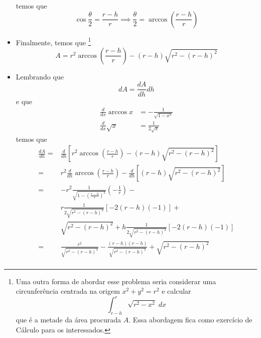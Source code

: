\documentclass[brazilian,11pt]{article}
\begin{document}
\begin{itemize}
\begin{center}
        \end{center}
        temos que
        \[
            \cos{\frac{\theta}{2}}=\frac{r-h}{r} \implies
            \frac{\theta}{2}=\arccos{\left(\frac{r-h}{r}\right)}
        \]
    \item Finalmente, temos que
        \footnote{Uma outra forma de abordar esse problema seria considerar uma 
        circunferência centrada na origem \(x^2+y^2=r^2\) e calcular
        \[
            \int_{r-h}^{r} \sqrt{r^2-x^2}\; dx
        \]
        que é a metade da área procurada \(A\). Essa abordagem fica como 
        exercício de Cálculo para os interessados.
        }
        \[
            A=
            r^2\arccos{\left(\frac{r-h}{r}\right)}
            -
            (r-h) \sqrt{r^2-(r-h)^2}
        \]
    \item Lembrando que 
        \[
            dA=\frac{dA}{dh} dh
        \]
        e que 
        \begin{align*}
            \frac{d}{dx}\arccos x &= -\frac{1}{\sqrt{1-x^2}} \\
            \frac{d}{dx}\sqrt{x} &=\frac{1}{2\sqrt{x}}
        \end{align*}
        temos que
        \[
            \begin{split}
                \frac{dA}{dh} =&
                \frac{d}{dh}\left[
                    r^2\arccos{\left(\frac{r-h}{r}\right)}
                    -
                    (r-h) \sqrt{r^2-(r-h)^2}
                    \right] \\
                =&r^2\frac{d}{dh}\arccos{\left(\frac{r-h}{r}\right)}
                -
                \frac{d}{dh}\left[
                    (r-h) \sqrt{r^2-(r-h)^2}
                \right] \\
            =&-r^2\frac{1}{\sqrt{1-\left(\frac{r-h}{r}\right)^2}}
                \left(-\frac{1}{r}\right)-\\
                &r\frac{1}{2\sqrt{r^2-(r-h)^2}}
                [-2(r-h)(-1)]+\\
                &\sqrt{r^2-(r-h)^2}+
                h\frac{1}{2\sqrt{r^2-(r-h)^2}}
                [-2(r-h)(-1)]\\
                =&\frac{r^2}{\sqrt{r^2-(r-h)^2}}-
                \frac{(r-h)(r-h)}{\sqrt{r^2-(r-h)^2}}+
                \sqrt{r^2-(r-h)^2} \\

\end{split}\]
\end{itemize}
\end{document}
